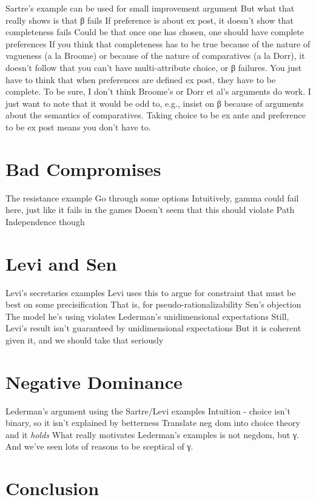 \documentclass[
  11pt,
  letterpaper,
  DIV=11,
  numbers=noendperiod,
  twoside]{scrartcl}
\begin{document}
Sartre's example can be used for small improvement argument But what
that really shows is that β fails If preference is about ex post, it
doesn't show that completeness fails Could be that once one has chosen,
one should have complete preferences If you think that completeness has
to be true because of the nature of vagueness (a la Broome) or because
of the nature of comparatives (a la Dorr), it doesn't follow that you
can't have multi-attribute choice, or β failures. You just have to think
that when preferences are defined ex post, they have to be complete. To
be sure, I don't think Broome's or Dorr et al's arguments do work. I
just want to note that it would be odd to, e.g., insist on β because of
arguments about the semantics of comparatives. Taking choice to be ex
ante and preference to be ex post means you don't have to.

\section{Bad Compromises}\label{sec-badcomp}

The resistance example Go through some options Intuitively, gamma could
fail here, just like it fails in the games Doesn't seem that this should
violate Path Independence though

\section{Levi and Sen}\label{sec-levisen}

Levi's secretaries examples Levi uses this to argue for constraint that
must be best on some precisification That is, for
pseudo-rationalizability Sen's objection The model he's using violates
Lederman's unidimensional expectations Still, Levi's result isn't
guaranteed by unidimensional expectations But it is coherent given it,
and we should take that seriously

\section{Negative Dominance}\label{sec-negdom}

Lederman's argument using the Sartre/Levi examples Intuition - choice
isn't binary, so it isn't explained by betterness Translate neg dom into
choice theory and it \emph{holds} What really motivates Lederman's
examples is not negdom, but γ. And we've seen lots of reasons to be
sceptical of γ.

\section{Conclusion}\label{conclusion}
\end{document}
